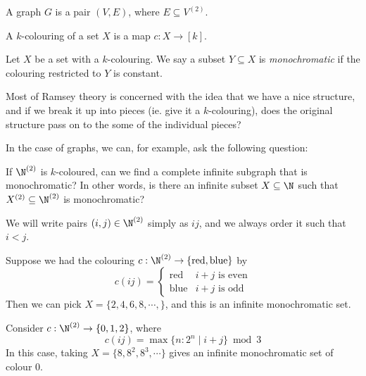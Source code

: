 \documentclass[a4paper]{article}
\begin{document}
\begin{defi}[Graph]
  A graph $G$ is a pair $(V, E)$, where $E \subseteq V^{(2)}$.
\end{defi}

\begin{defi}[$k$-colouring]
  A $k$-colouring of a set $X$ is a map $c: X \to [k]$.
\end{defi}

\begin{defi}
  Let $X$ be a set with a $k$-colouring. We say a subset $Y \subseteq X$ is \emph{monochromatic} if the colouring restricted to $Y$ is constant.
\end{defi}
Most of Ramsey theory is concerned with the idea that we have a nice structure, and if we break it up into pieces (ie. give it a $k$-colouring), does the original structure pass on to the some of the individual pieces?

In the case of graphs, we can, for example, ask the following question:
\begin{question}
  If $\N^{(2)}$ is $k$-coloured, can we find a complete infinite subgraph that is monochromatic? In other words, is there an infinite subset $X \subseteq \N$ such that $X^{(2)} \subseteq \N^{(2)}$ is monochromatic?
\end{question}

\begin{notation}
  We will write pairs $(i, j) \in \N^{(2)}$ simply as $ij$, and we always order it such that $i < j$.
\end{notation}

\begin{eg}
  Suppose we had the colouring $c: \N^{(2)} \to \{\mathrm{red}, \mathrm{blue}\}$ by
  \[
    c(ij) =
    \begin{cases}
      \mathrm{red} & i + j \text{ is even}\\
      \mathrm{blue} & i + j \text{ is odd}
    \end{cases}
  \]
  Then we can pick $X = \{2, 4, 6, 8, \cdots, \}$, and this is an infinite monochromatic set.
\end{eg}

\begin{eg}
  Consider $c: \N^{(2)} \to \{0, 1, 2\}$, where
  \[
    c(ij) = \max \{n: 2^n \mid i + j\} \bmod 3
  \]
  In this case, taking $X = \{8, 8^2, 8^3, \cdots\}$ gives an infinite monochromatic set of colour $0$.
\end{eg}
\end{document}
